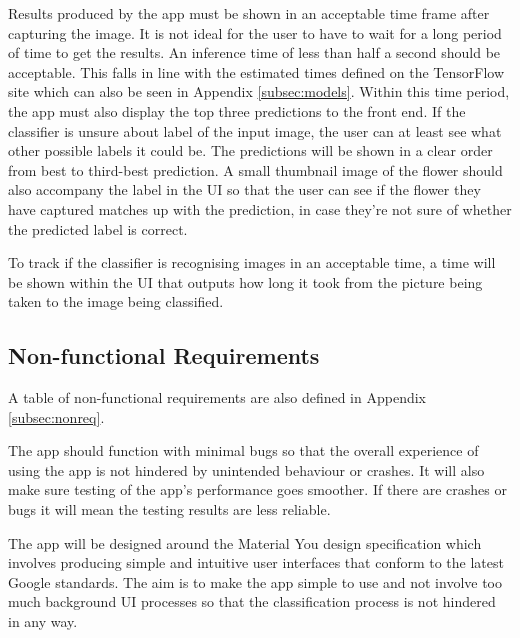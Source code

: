 \documentclass[12pt,a4paper]{report}
\begin{document}
\par

Results produced by the app must be shown in an acceptable time frame after capturing the image. It is not ideal for 
the user to have to wait for a long period of time to get the results. An inference time of less than 
half a second should be acceptable. This falls in line with the estimated times defined on the TensorFlow site which can also 
be seen in Appendix \ref{subsec:models}. Within this time period, the app must also display the top three predictions 
to the front end. 
If the classifier is unsure about label of the input image, the user can at least see what other possible labels it 
could be. The predictions will be shown in a clear order from best to third-best prediction. A small thumbnail image of 
the flower should also accompany the label in the UI so that the user can see if the flower they have captured matches 
up with the prediction, in case they're not sure of whether the predicted label is correct. 

\par

To track if the classifier is recognising images in an acceptable time, a time will be shown within the UI that outputs 
how long it took from the picture being taken to the image being classified.

\subsection{Non-functional Requirements}

A table of non-functional requirements are also defined in Appendix \ref{subsec:nonreq}.

\par

The app should function with minimal bugs so that the overall experience of using the app is not hindered by unintended 
behaviour or crashes. It will also make sure testing of the app's performance goes smoother. If there are crashes or 
bugs it will mean the testing results are less reliable.

\par

The app will be designed around the Material You design specification which involves producing simple and intuitive user
interfaces that conform to the latest Google standards. The aim is to make the app simple to use and not involve too 
much background UI processes so that the classification process is not hindered in any way. 
\end{document}

